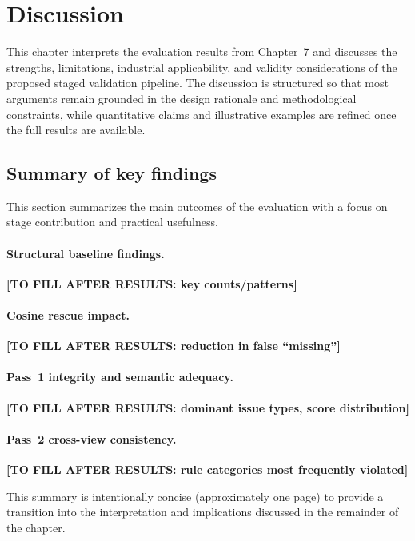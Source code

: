 \section{Discussion}
\label{sec:discussion}

This chapter interprets the evaluation results from Chapter~7 and discusses the strengths, limitations, industrial applicability, and validity considerations of the proposed staged validation pipeline. The discussion is structured so that most arguments remain grounded in the design rationale and methodological constraints, while quantitative claims and illustrative examples are refined once the full results are available.

\subsection{Summary of key findings}
\label{sec:discussion_summary_findings}

This section summarizes the main outcomes of the evaluation with a focus on stage contribution and practical usefulness.

\paragraph{Structural baseline findings.} \textbf{[TO FILL AFTER RESULTS: key counts/patterns]}

\paragraph{Cosine rescue impact.} \textbf{[TO FILL AFTER RESULTS: reduction in false ``missing'']}

\paragraph{Pass~1 integrity and semantic adequacy.} \textbf{[TO FILL AFTER RESULTS: dominant issue types, score distribution]}

\paragraph{Pass~2 cross-view consistency.} \textbf{[TO FILL AFTER RESULTS: rule categories most frequently violated]}

This summary is intentionally concise (approximately one page) to provide a transition into the interpretation and implications discussed in the remainder of the chapter.

